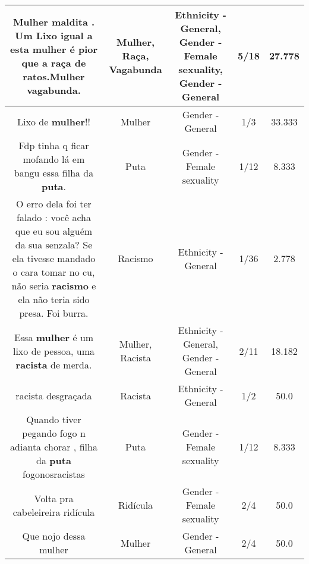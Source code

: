 \documentclass[11pt]{article}
\newlength\mylength
\begin{document}
\begin{center}
\begin{longtable}{|C{.65\mylength}|C{.30\mylength}|C{.12\mylength}|C{.12\mylength}|C{.12\mylength}|}
  \small Mulher maldita . Um Lixo igual a esta \textbf{mulher} é pior que a \textbf{raça} de ratos.\textbf{Mulher} \textbf{vagabunda}.\normalsize   & Mulher, Raça, Vagabunda & Ethnicity - General, Gender - Female sexuality, Gender - General & 5/18 & 27.778 \\  \hline
  \small Lixo de \textbf{mulher}!!\normalsize   & Mulher & Gender - General & 1/3 & 33.333 \\  \hline
  \small Fdp tinha q ficar mofando lá em bangu essa filha da \textbf{puta}.\normalsize   & Puta & Gender - Female sexuality & 1/12 & 8.333 \\  \hline
  \small O erro dela foi ter falado : você acha que eu sou alguém da sua senzala? Se ela tivesse mandado o cara tomar no cu, não seria \textbf{racismo} e ela não teria sido presa. Foi burra.\normalsize   & Racismo & Ethnicity - General & 1/36 & 2.778 \\  \hline
  \small Essa \textbf{mulher} é um lixo de pessoa, uma \textbf{racista} de merda.\normalsize   & Mulher, Racista & Ethnicity - General, Gender - General & 2/11 & 18.182 \\  \hline
  \small racista desgraçada\normalsize   & Racista & Ethnicity - General & 1/2 & 50.0 \\  \hline
  \small Quando tiver pegando fogo n adianta chorar , filha da \textbf{puta} fogonosracistas\normalsize   & Puta & Gender - Female sexuality & 1/12 & 8.333 \\  \hline
  \small Volta pra cabeleireira ridícula\normalsize   & Ridícula & Gender - Female sexuality & 2/4 & 50.0 \\  \hline
  \small Que nojo dessa mulher\normalsize   & Mulher & Gender - General & 2/4 & 50.0 \\  \hline

\end{longtable}
\end{center}
\end{document}
